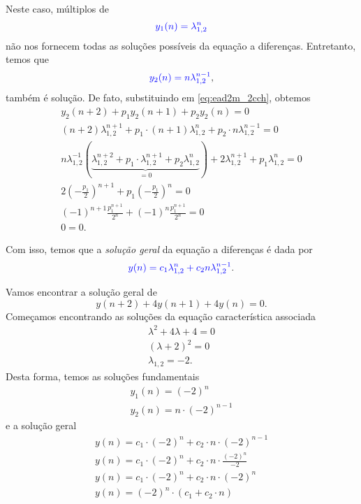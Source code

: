 Neste caso, múltiplos de
\begin{equation}
  {\color{blue}y_1(n) = \lambda^n_{1,2}}
\end{equation}
não nos fornecem todas as soluções possíveis da equação a diferenças. Entretanto, temos que
\begin{equation}
  {\color{blue}y_2(n) = n\lambda_{1,2}^{n-1}},
\end{equation}
também é solução. De fato, substituindo em \eqref{eq:ead2m_2cch}, obtemos
\begin{gather}
  y_2(n+2) + p_1y_2(n+1) + p_2y_2(n) = 0\\
  (n+2)\lambda_{1,2}^{n+1} + p_1\cdot(n+1)\lambda_{1,2}^n + p_2\cdot n\lambda_{1,2}^{n-1} = 0\\
  n\lambda_{1,2}^{-1}\left(\underbrace{\lambda_{1,2}^{n+2}+p_1\cdot\lambda_{1,2}^{n+1}+p_2\lambda_{1,2}^n}_{=0}\right) + 2\lambda_{1,2}^{n+1}+p_1\lambda_{1,2}^n = 0\\
  2\left(-\frac{p_1}{2}\right)^{n+1}+p_1\left(-\frac{p_1}{2}\right)^n = 0\\
  (-1)^{n+1}\frac{p_1^{n+1}}{2^n} + (-1)^n\frac{p_1^{n+1}}{2^n} = 0\\
  0 = 0.
\end{gather}

Com isso, temos que a \emph{solução geral} da equação a diferenças é dada por
\begin{equation}
  {\color{blue}y(n) = c_1\lambda_{1,2}^n + c_2n\lambda_{1,2}^{n-1}}.
\end{equation}

\begin{ex}
  Vamos encontrar a solução geral de
  \begin{equation}
    y(n+2)+4y(n+1)+4y(n)=0.
  \end{equation}
  Começamos encontrando as soluções da equação característica associada
  \begin{gather}
    \lambda^2 + 4\lambda + 4 = 0\\
    (\lambda+2)^2 = 0 \\
    \lambda_{1,2} = -2.
  \end{gather}
  Desta forma, temos as soluções fundamentais
  \begin{gather}
    y_1(n) = (-2)^n\\
    y_2(n) = n\cdot (-2)^{n-1}
  \end{gather}
  e a solução geral
  \begin{gather}
    y(n) = c_1\cdot (-2)^n + c_2\cdot n\cdot (-2)^{n-1}\\
    y(n) = c_1\cdot (-2)^n + c_2\cdot n\cdot \frac{(-2)^n}{-2}\\
    y(n) = c_1\cdot(-2)^n + c_2\cdot n \cdot (-2)^n\\
    y(n) = (-2)^n\cdot \left(c_1 + c_2\cdot n\right)
  \end{gather}
\end{ex}

